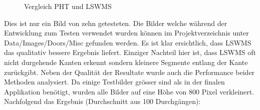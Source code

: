 \begin{figure}
\qquad
{}
\caption{Vergleich PHT und LSWMS}
\label{fig:comp-pht-lswms}
\end{figure}

\pagebreak

Dies ist nur ein Bild von zehn getesteten. Die Bilder welche während der Entwicklung zum Testen verwendet wurden können im Projektverzeichnis unter Data/Images/Doors/Misc gefunden werden. Es ist klar ersichtlich, dass LSWMS das qualitativ bessere Ergebnis liefert. Einziger Nachteil hier ist, dass LSWMS oft nicht durgehende Kanten erkennt sondern kleinere Segmente entlang der Kante zurückgibt. Neben der Qualität der Resultate wurde auch die Performance beider Methoden analysiert. Da einige Testbilder grösser sind als in der finalen Applikation benötigt, wurden alle Bilder auf eine Höhe von 800 Pixel verkleinert. Nachfolgend das Ergebnis (Durchschnitt aus 100 Durchgängen):

